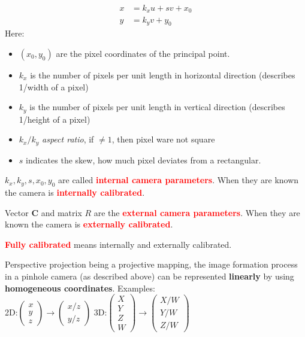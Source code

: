 \documentclass[a4paper, fontsize=8pt, landscape, DIV=1]{scrartcl}
\begin{document}
\begin{multicols*}{4}
		\begin{align*}
			x&=k_xu+sv+x_0\\
			y&=k_yv+y_0
		\end{align*}
		Here:
		\vspace{-0.2cm}
		\begin{itemize}[noitemsep]
			\item $(x_0,y_0)$ are the pixel coordinates of the principal point.
			\item $k_x$ is the number of pixels per unit length in horizontal direction (describes 1/width of a pixel)
			\item $k_y$ is the number of pixels per unit length in vertical direction (describes 1/height of a pixel)
			\item $k_x/k_y$ \textit{aspect ratio}, if $\neq1$, then pixel ware not square
			\item $s$ indicates the skew, how much pixel deviates from a rectangular. 
		\end{itemize}
		$k_x, k_y, s, x_0, y_0$ are called \textcolor{red}{\textbf{internal camera parameters}}. When they are known the camera is \textcolor{red}{\textbf{internally calibrated}}.
		\par 
		Vector $\mathbf{C}$ and matrix $R$ are the \textcolor{red}{\textbf{external camera parameters}}. When they are known the camera is \textcolor{red}{\textbf{externally calibrated}}. 
		\par 
		\textcolor{red}{\textbf{Fully calibrated}} means internally and externally calibrated.
		\par 
		Perspective projection being a projective mapping, the image formation process in a pinhole camera (as described above) can be represented \textbf{linearly} by using \textbf{homogeneous coordinates}. Examples:\\
		2D:\hspace{0.2cm}$\begin{pmatrix}x\\y\\z\end{pmatrix}\rightarrow\begin{pmatrix}x/z\\y/z\end{pmatrix}$\hspace{0.5cm}
		3D:\hspace{0.2cm}$\begin{pmatrix}X\\Y\\Z\\W\end{pmatrix}\rightarrow\begin{pmatrix}X/W\\Y/W\\Z/W\end{pmatrix}$\\

\end{multicols*}
\end{document}
